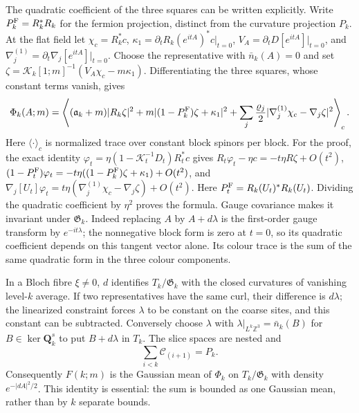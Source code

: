 \documentclass[11pt,letterpaper,reqno]{amsart}
\theoremstyle{definition}
\theoremstyle{remark}
\begin{document}
The quadratic coefficient of the three squares can be written
explicitly. Write $P_k^{\rm F}=R_k^*R_k$ for the fermion
projection, distinct from the curvature projection $P_k$.
At the flat field let $\chi_c=R_k^*c$,
$\kappa_1=\partial_tR_k(e^{itA})^*c|_{t=0}$,
$V_A=\partial_tD[e^{itA}]|_{t=0}$, and
$\nabla_j^{(1)}=\partial_t\nabla_j[e^{itA}]|_{t=0}$.
Choose the representative with $\bar n_k(A)=0$ and set
$\zeta=\mathcal K_k[1;m]^{-1}(V_A\chi_c-m\kappa_1)$.
Differentiating the three squares, whose constant terms vanish,
gives
\[
 \Phi_k(A;m)=\left\langle
 (\mathfrak a_k+m)|R_k\zeta|^2+
 m|(1-P_k^{\rm F})\zeta+\kappa_1|^2+
 \sum_j\frac{\varrho_j}2
        |\nabla_j^{(1)}\chi_c-\nabla_j\zeta|^2
 \right\rangle_c.
\]
Here $\langle\cdot\rangle_c$ is normalized trace over constant
block spinors per block.  For the proof, the exact identity
$\varphi_t=\eta(1-\mathcal K_t^{-1}D_t)R_t^*c$ gives
$R_t\varphi_t-\eta c=-t\eta R\zeta+O(t^2)$,
$(1-P_t^{\rm F})\varphi_t=-t\eta((1-P_k^{\rm F})\zeta+\kappa_1)+O(t^2)$,
and $\nabla_j[U_t]\varphi_t=
t\eta(\nabla_j^{(1)}\chi_c-\nabla_j\zeta)+O(t^2)$.
Here $P_t^{\rm F}=R_k(U_t)^*R_k(U_t)$.
Dividing the quadratic coefficient by $\eta^2$ proves the formula.
Gauge covariance makes it invariant under $\mathfrak G_k$.
Indeed replacing $A$ by $A+d\lambda$ is the first-order gauge
transform by $e^{-it\lambda}$; the nonnegative block form is
zero at $t=0$, so its quadratic coefficient depends on this
tangent vector alone.  Its colour trace is the sum of the same
quadratic form in the three colour components.

In a Bloch fibre $\xi\ne0$, $d$ identifies
$T_k/\mathfrak G_k$ with the closed curvatures of vanishing
level-$k$ average.  If two representatives have the same curl,
their difference is $d\lambda$; the linearized constraint
forces $\lambda$ to be constant on the coarse sites, and this
constant can be subtracted.  Conversely choose $\lambda$ with
$\lambda|_{L^k\mathbb Z^3}=\bar n_k(B)$ for
$B\in\ker\mathbf Q_k^s$ to put $B+d\lambda$ in $T_k$.
The slice spaces are nested and
\[
 \sum_{i<k}\mathcal C_{(i+1)}=P_k.
\]
Consequently $F(k;m)$ is the Gaussian mean of $\Phi_k$ on
$T_k/\mathfrak G_k$ with density $e^{-|dA|^2/2}$.
This identity is essential: the sum is bounded as one Gaussian
mean, rather than by $k$ separate bounds.
\end{document}
